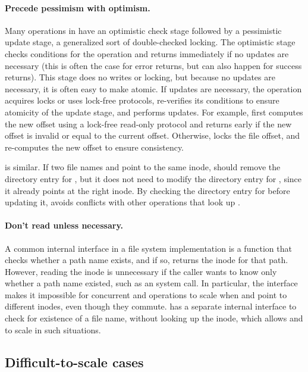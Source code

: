 \paragraph{Precede pessimism with optimism.}  \cbstart Many operations
in \fs have an optimistic check stage followed by a pessimistic update
stage, a generalized sort of double-checked locking.  The optimistic
stage checks conditions for the operation and returns immediately if
no updates are necessary (this is often the case for error returns,
but can also happen for success returns).  This stage does no writes
or locking, but because no updates are necessary, it is often easy to
make atomic.  If updates are necessary, the operation acquires
locks or uses lock-free protocols, re-verifies its conditions to
ensure atomicity of the update stage, and performs updates.  For
example,  first computes the new offset using a lock-free
read-only protocol and returns early if the new offset is invalid or
equal to the current offset.  Otherwise,  locks the file
offset, and re-computes the new offset to ensure consistency. \cbend

 is similar.  If two file names  and 
point to the
same inode,  should remove the directory entry for
, but it does not need to modify the directory entry for
, since
it already points at the right inode.  By checking the directory
entry for  before updating it,  avoids
conflicts with other operations that look up .


\paragraph{Don't read unless necessary.}  A common internal interface
in a file system implementation is a  function that
checks whether a path name exists, and if so, returns the inode for
that path.
%
However, reading the inode is unnecessary
if the caller wants to know only whether a path name existed, such as
an  system call.  In particular, the 
interface makes it impossible for concurrent 
and  operations to scale when  and 
point to different inodes, even though they commute.
\fs has a separate internal interface to check for existence of a
file name, without looking up the inode, which allows 
and  to scale in such situations.


\subsection{Difficult-to-scale cases}

